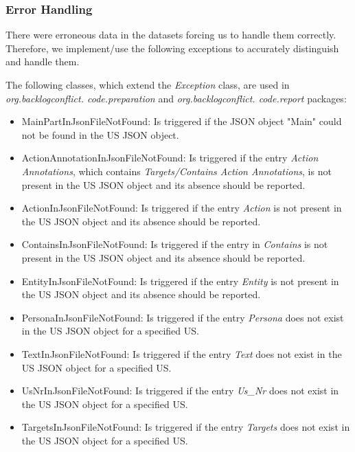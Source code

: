 \subsubsection*{Error Handling}
There were erroneous data in the datasets forcing us to handle them correctly. Therefore, we implement/use the following exceptions to accurately distinguish and handle them.

The following classes, which extend the \textit{Exception} class, are used in \textit{org.backlogconflict. code.preparation} and \textit{org.backlogconflict. code.report} packages:
\begin{itemize}
	\item MainPartInJsonFileNotFound: Is triggered if the JSON object "Main" could not be found in the US JSON object.
	
	\item ActionAnnotationInJsonFileNotFound: Is triggered if the entry \textit{Action Annotations}, which contains \textit{Targets/Contains Action Annotations}, is not present in the US JSON object and its absence should be reported.
	
	\item ActionInJsonFileNotFound: Is triggered if the entry \textit{Action} is not present in the US JSON object and its absence should be reported.
		
	\item ContainsInJsonFileNotFound: Is triggered if the entry in \textit{Contains} is not present in the US JSON object and its absence should be reported.
	
	\item EntityInJsonFileNotFound: Is triggered if the entry \textit{Entity} is not present in the US JSON object and its absence should be reported.
	
	\item PersonaInJsonFileNotFound: Is triggered if the entry \textit{Persona} does not exist in the US JSON object for a specified US.
	
	\item TextInJsonFileNotFound: Is triggered if the entry \textit{Text} does not exist in the US JSON object for a specified US. 
	
	\item UsNrInJsonFileNotFound: Is triggered if the entry \textit{Us\_Nr} does not exist in the US JSON object for a specified US.
	
	\item TargetsInJsonFileNotFound: Is triggered if the entry \textit{Targets} does not exist in the US JSON object for a specified US.
	

\end{itemize}
